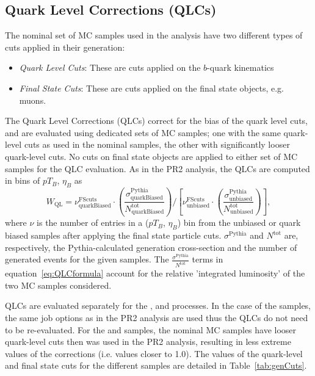 \subsection{Quark Level Corrections (QLCs)}
\label{sec:QLCs}

The nominal set of MC samples used in the analysis have two different types of cuts applied in their generation:
\begin{itemize}
    \item \textit{Quark Level Cuts}: These are cuts applied on the $b$-quark kinematics
    \item \textit{Final State Cuts}: These are cuts applied on the final state objects, e.g. muons.  
\end{itemize}
The Quark Level Corrections (QLCs) correct for the bias of the quark level cuts, and are evaluated using dedicated sets of MC samples; one with the same quark-level cuts as used in the nominal samples, the other with significantly looser quark-level cuts.  
No cuts on final state objects are applied to either set of MC samples for the QLC evaluation.
As in the PR2 analysis, the QLCs are computed in bins of $pT_B$, $\eta_B$ as  
\begin{equation}
 W_{\text{QL}} = \nu^{\text{FScuts}}_{\text{quarkBiased}} \cdot \left(  \frac{\sigma^{\text{Pythia}}_{\text{quarkBiased}}}{N^{\text{tot}}_{\text{quarkBiased}}} \right) / \left[ \nu^{\text{FScuts}}_{\text{unbiased}} \cdot \left( \frac{\sigma^{\text{Pythia}}_{\text{unbiased}}}{N^{\text{tot}}_{\text{unbiased}}} \right) \right],
\label{eq:QLCformula}
\end{equation}
where $\nu$ is the number of entries in a ($pT_B$, $\eta_B$) bin from 
the unbiased or quark biased samples after applying the final state 
particle cuts. $\sigma^{\text{Pythia}}$ and $N^{\text{tot}}$ are, respectively, the Pythia-calculated generation cross-section and the number of generated events for the given samples. 
The $\frac{\sigma^{\text{Pythia}}}{N^{\text{tot}}}$ terms in equation~\ref{eq:QLCformula} account for the relative 'integrated luminosity' of the two MC samples considered.


QLCs are evaluated separately for the \Bmumu, \BpmKpmJpsi and \BsJpsiPhi processes. 
In the case of the \Bmumu samples, the same job options as in the PR2 analysis are used thus the QLCs do not need to be re-evaluated. 
For the \BpmKpmJpsi and \BsJpsiPhi samples, the nominal MC samples have looser quark-level cuts then was used in the PR2 analysis, resulting in less extreme  values of the corrections (i.e. values closer to 1.0). 
The values of the quark-level and final state cuts for the different samples are detailed in Table~\ref{tab:genCuts}. 

